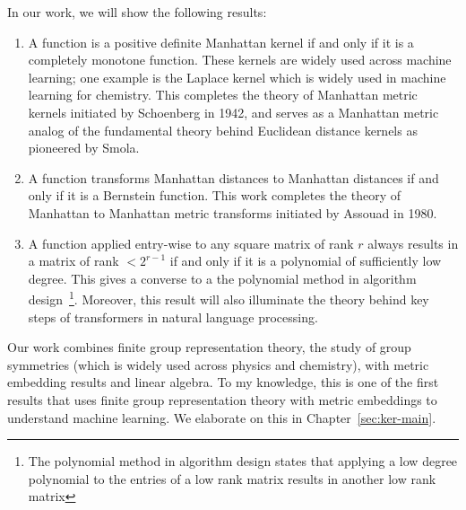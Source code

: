   In our work, we will show the following results:
\begin{enumerate}
    \item A function is a positive definite Manhattan kernel if and only
    if it is a completely monotone function. These kernels are widely
    used across machine learning; one example is the Laplace kernel
    which is widely used in machine learning for chemistry. This
    completes the theory of Manhattan metric kernels initiated by
    Schoenberg in 1942, and serves as a Manhattan metric analog of the
    fundamental theory behind Euclidean distance kernels as pioneered by
    Smola.
    \item A function transforms Manhattan distances to Manhattan
    distances if and only if it is a Bernstein function. This work completes the theory of Manhattan to Manhattan metric transforms initiated by Assouad in 1980.
    \item A function applied entry-wise to any square matrix of rank $r$
    always results in a matrix of rank  $< 2^{r-1}$ if and only if it is
    a polynomial of sufficiently low degree. This gives a converse to a
    the polynomial method in algorithm design~\footnote{The polynomial
      method in algorithm design states that applying a low degree
        polynomial to the entries of a low rank matrix results in
        another low rank matrix}.
    Moreover, this result will also illuminate the theory behind key steps of
    transformers in natural language processing.
\end{enumerate} 

Our work combines finite group representation theory, the study of group
symmetries (which is widely used across physics and chemistry), with
metric embedding results and linear algebra. To my knowledge, this is
one of the first results that uses finite group representation theory
with metric embeddings to understand machine learning. We elaborate on
this in Chapter~\ref{sec:ker-main}.

